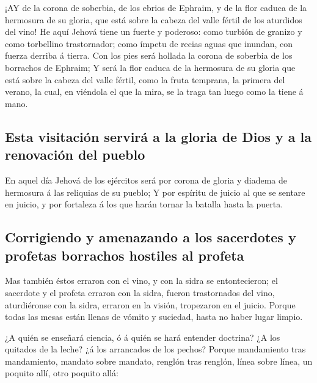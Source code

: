  ¡AY de la corona de soberbia, de los ebrios de Ephraim, y
de la flor caduca de la hermosura de su gloria, que está sobre la cabeza
del valle fértil de los aturdidos del vino!  He aquí Jehová
tiene un fuerte y poderoso: como turbión de granizo y como torbellino
trastornador; como ímpetu de recias aguas que inundan, con fuerza
derriba á tierra.  Con los pies será hollada la corona de
soberbia de los borrachos de Ephraim;  Y será la flor caduca
de la hermosura de su gloria que está sobre la cabeza del valle fértil,
como la fruta temprana, la primera del verano, la cual, en viéndola el
que la mira, se la traga tan luego como la tiene á mano.

\hypertarget{esta-visitaciuxf3n-serviruxe1-a-la-gloria-de-dios-y-a-la-renovaciuxf3n-del-pueblo}{%
\subsection{Esta visitación servirá a la gloria de Dios y a la
renovación del
pueblo}\label{esta-visitaciuxf3n-serviruxe1-a-la-gloria-de-dios-y-a-la-renovaciuxf3n-del-pueblo}}

 En aquel día Jehová de los ejércitos será por corona de
gloria y diadema de hermosura á las reliquias de su pueblo; 
Y por espíritu de juicio al que se sentare en juicio, y por fortaleza á
los que harán tornar la batalla hasta la puerta.

\hypertarget{corrigiendo-y-amenazando-a-los-sacerdotes-y-profetas-borrachos-hostiles-al-profeta}{%
\subsection{Corrigiendo y amenazando a los sacerdotes y profetas
borrachos hostiles al
profeta}\label{corrigiendo-y-amenazando-a-los-sacerdotes-y-profetas-borrachos-hostiles-al-profeta}}

 Mas también éstos erraron con el vino, y con la sidra se
entontecieron; el sacerdote y el profeta erraron con la sidra, fueron
trastornados del vino, aturdiéronse con la sidra, erraron en la visión,
tropezaron en el juicio.  Porque todas las mesas están
llenas de vómito y suciedad, hasta no haber lugar limpio.

 ¿A quién se enseñará ciencia, ó á quién se hará entender
doctrina? ¿A los quitados de la leche? ¿á los arrancados de los pechos?
 Porque mandamiento tras mandamiento, mandato sobre
mandato, renglón tras renglón, línea sobre línea, un poquito allí, otro
poquito allá:

